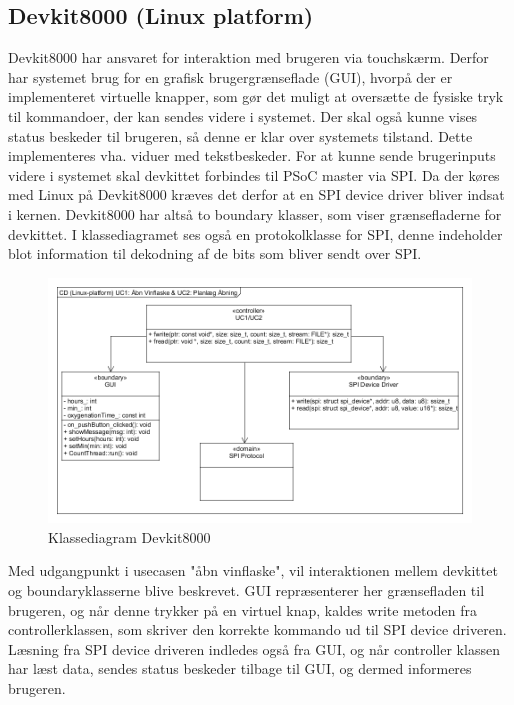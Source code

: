 \subsection{Devkit8000 (Linux platform)}

Devkit8000 har ansvaret for interaktion med brugeren via touchskærm. Derfor har systemet brug for en grafisk brugergrænseflade (GUI), hvorpå der er
implementeret virtuelle knapper, som gør det muligt at oversætte de fysiske tryk til kommandoer, der kan sendes videre i systemet. Der skal også kunne vises
status beskeder til brugeren, så denne er klar over systemets tilstand. Dette implementeres vha. viduer med tekstbeskeder. For at kunne sende brugerinputs 
videre i systemet skal devkittet forbindes til PSoC master via SPI. Da der køres med Linux på Devkit8000 kræves det derfor at en SPI device driver bliver
indsat i kernen. Devkit8000 har altså to boundary klasser, som viser grænsefladerne for devkittet. I klassediagramet ses også en protokolklasse for SPI, denne 
indeholder blot information til dekodning af de bits som bliver sendt over SPI.\\

\begin{figure}[H]
\includegraphics[scale=0.4]{tex/Arkitektur/Fotos/SW/Klassediagram_Linuxplatform}
\caption{Klassediagram Devkit8000}
\end{figure}

Med udgangpunkt i usecasen "åbn vinflaske", vil interaktionen mellem devkittet og boundaryklasserne blive beskrevet. 
GUI repræsenterer her grænsefladen til brugeren, og når denne trykker på en virtuel knap, kaldes write metoden fra controllerklassen, som skriver den korrekte 
kommando ud til SPI device driveren. Læsning fra SPI device driveren indledes også fra GUI, og når controller klassen har læst data, sendes status beskeder 
tilbage til GUI, og dermed informeres brugeren.\\

